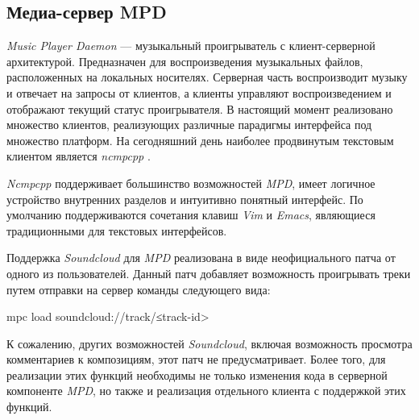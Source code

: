 \subsection{Медиа-сервер MPD}

{\itshape Music Player Daemon}\cite{mpd:wiki} --- музыкальный
проигрыватель с клиент-серверной архитектурой. Предназначен для
воспроизведения музыкальных файлов, расположенных на локальных
носителях. Серверная часть воспроизводит музыку и отвечает на запросы
от клиентов, а клиенты управляют воспроизведением и отображают текущий
статус проигрывателя. В настоящий момент реализовано множество
клиентов, реализующих различные парадигмы интерфейса под множество
платформ. На сегодняшний день наиболее продвинутым текстовым клиентом
является {\itshape ncmpcpp} \cite{ncmpcpp:main}.


{\itshape Ncmpcpp} поддерживает большинство возможностей {\itshape
MPD}, имеет логичное устройство внутренних разделов и интуитивно
понятный интерфейс. По умолчанию поддерживаются сочетания клавиш
{\itshape Vim} и {\itshape Emacs}, являющиеся традиционными для
текстовых интерфейсов.

Поддержка \textit{Soundcloud} для \textit{MPD} реализована в виде
неофициального патча от одного из
пользователей\cite{mpd:sc-patch}. Данный патч добавляет возможность
проигрывать треки путем отправки на сервер команды следующего вида:
\begin{bashcode}
  mpc load soundcloud://track/≤track-id>
\end{bashcode}

К сожалению, других возможностей \textit{Soundcloud}, включая
возможность просмотра комментариев к композициям, этот патч не
предусматривает. Более того, для реализации этих функций необходимы не
только изменения кода в серверной компоненте \textit{MPD}, но также и
реализация отдельного клиента с поддержкой этих функций.
